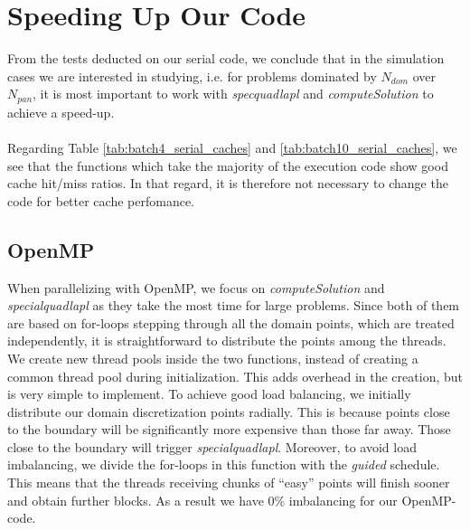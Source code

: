 \documentclass[a4paper,10pt]{article}
\begin{document}
\FloatBarrier

\section*{Speeding Up Our Code}
From the tests deducted on our serial code, we conclude that in the simulation cases we are interested in studying, i.e. for problems dominated by $N_{dom}$ over $N_{pan}$, it is most important to work with \textit{specquadlapl} and \textit{computeSolution} to achieve a speed-up. 
\\ \\
Regarding Table \ref{tab:batch4_serial_caches} and \ref{tab:batch10_serial_caches}, we see that the functions which take the majority of the execution code show good cache hit/miss ratios. In that regard, it is therefore not necessary to change the code for better cache perfomance. 

\subsection*{OpenMP}
When parallelizing with OpenMP, we focus on \textit{computeSolution} and \textit{specialquadlapl} as they take the most time for large problems. Since both of them are based on for-loops stepping through all the domain points, which are treated independently, it is straightforward to distribute the points among the threads. We create new thread pools inside the two functions, instead of creating a common thread pool during initialization. This adds overhead in the creation, but is very simple to implement. To achieve good load balancing, we initially distribute our domain discretization points radially. This is because points close to the boundary will be significantly more expensive than those far away. Those close to the boundary will trigger \textit{specialquadlapl}. Moreover, to avoid load imbalancing, we divide the for-loops in this function with the \textit{guided} schedule. This means that the threads receiving chunks of ``easy'' points will finish sooner and obtain further blocks. As a result we have $0\%$ imbalancing for our OpenMP-code. 
\\ \\
\end{document}
